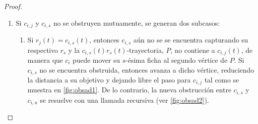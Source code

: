 \begin{proof}
\begin{enumerate}
\begin{figure}[!htbp]
\begin{tcbitemize}
            \end{tcbitemize}
            \captionsetup{font=footnotesize}
            \caption{Si $c_{i,j}$ y $c_{i,s}$ se obstruyen mutuamente, entonces
            intercambian etiquetas (y por lo tanto objetivos). Las dem\'as
            fichas se mantienen sin cambio.}
            \label{fig:obsmutua}
        \end{figure}

        \item Si $c_{i,j}$ y $c_{i,s}$ no se obstruyen mutuamente, se generan dos
            subcasos:
        \begin{enumerate}
            \item Si $r_j(t)=c_{i,s}(t)$, entonces $c_{i,s}$ a\'un no se se
            encuentra capturando su respectivo $r_s$ y la
            $c_{i,s}(t)r_s(t)$-trayectoria, $P$, no contiene a $c_{i,j}(t)$, de
            manera que $c_i$ puede mover su $s$-\'esima ficha al segundo
            v\'ertice de $P$. Si $c_{i,s}$ no se encuentra obstruida, entonces
            avanza a dicho v\'ertice, reduciendo la distancia a su objetivo y
            dejando libre el paso para $c_{i,j}$ tal como se muestra en
            \cref{fig:obsad1}. De lo contrario, la nueva obstrucci\'on entre
            $c_{i,s}$ y $c_{i,u}$ se resuelve con una llamada recursiva (ver
            \cref{fig:obsad2}).


\end{enumerate}
\end{enumerate}
\end{proof}
